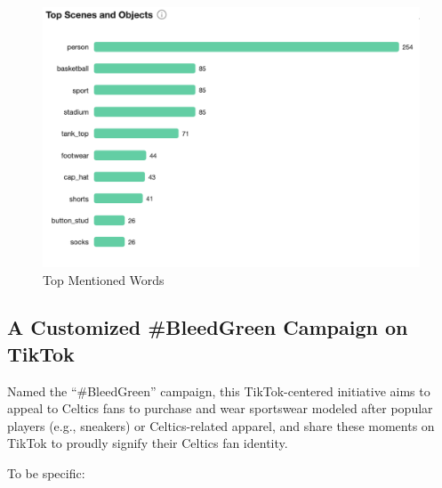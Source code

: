 \documentclass[
]{book}
\begin{document}
\begin{figure}
\centering
\includegraphics{5.png}
\caption{Top Mentioned Words}
\end{figure}

\hypertarget{a-customized-bleedgreen-campaign-on-tiktok}{%
\subsection{A Customized \#BleedGreen Campaign on TikTok}\label{a-customized-bleedgreen-campaign-on-tiktok}}

Named the ``\#BleedGreen'' campaign, this TikTok-centered initiative aims to appeal to Celtics fans to purchase and wear sportswear modeled after popular players (e.g., sneakers) or Celtics-related apparel, and share these moments on TikTok to proudly signify their Celtics fan identity.

To be specific:
\end{document}
